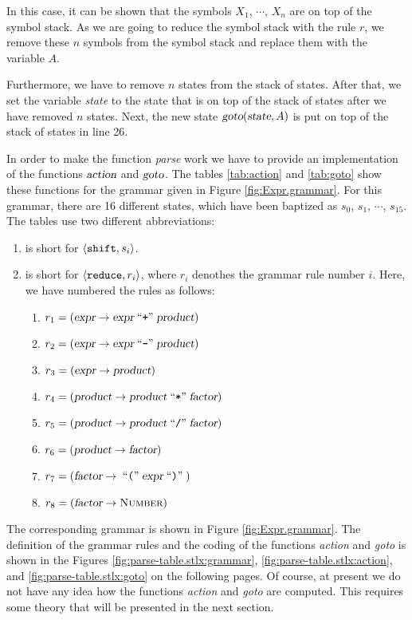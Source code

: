 \begin{enumerate}
\begin{enumerate}
            In this case, it can be shown that the symbols $X_1$, $\cdots$, $X_n$ are on top of the
            symbol stack.  As we are going to reduce the symbol stack with the rule $r$,
            we remove these $n$ symbols from the symbol stack and replace them with the
            variable $A$.
            
            Furthermore, we have to remove $n$ states from the stack of states.
            After that, we set the variable \textsl{state} to the state that is on top of the
            stack of states after we have removed $n$ states.  Next, the new state
            $\textsl{goto}(\textsl{state}, A)$ is put on top of the stack of states in line 26.
      \end{enumerate}
\end{enumerate}
In order to make the function \textsl{parse} work we have to provide an implementation
of the functions $\textsl{action}$ and $\textsl{goto}$.
The tables  \ref{tab:action} and \ref{tab:goto} show these functions for the grammar given
in Figure \ref{fig:Expr.grammar}.  For this grammar, there are 16 different states, which have
been baptized as $s_0$, $s_1$, $\cdots$, $s_{15}$.  The tables use two different abbreviations:
\begin{enumerate}
\item {} is short for $\pair(\texttt{shift}, s_i)$.
\item {} is short for  $\pair(\texttt{reduce}, r_i)$, where $r_i$ denothes the
      grammar rule number $i$.  Here, we have numbered the rules as follows:
      \begin{enumerate}
      \item $r_1 = (\textsl{expr} \rightarrow \textsl{expr} \;\mbox{``\texttt{+}''}\; \textsl{product})$
      \item $r_2 = (\textsl{expr} \rightarrow \textsl{expr} \;\mbox{``\texttt{-}''}\; \textsl{product})$
      \item $r_3 = (\textsl{expr} \rightarrow \textsl{product})$
      \item $r_4 = (\textsl{product} \rightarrow \textsl{product} \;\mbox{``\texttt{*}''}\; \textsl{factor})$
      \item $r_5 = (\textsl{product} \rightarrow \textsl{product} \;\mbox{``\texttt{/}''}\; \textsl{factor})$
      \item $r_6 = (\textsl{product} \rightarrow \textsl{factor})$
      \item $r_7 = (\textsl{factor} \rightarrow  \;\mbox{``\texttt{(}''}\; \textsl{expr} \;\mbox{``\texttt{)}''}\;)$
      \item $r_8 = (\textsl{factor} \rightarrow  \textsc{Number})$
      \end{enumerate}
\end{enumerate}
The corresponding grammar is shown in Figure \ref{fig:Expr.grammar}.  The definition of the grammar rules
and the coding of the
functions \textsl{action} and \textsl{goto} is shown in the Figures
\ref{fig:parse-table.stlx:grammar}, \ref{fig:parse-table.stlx:action}, and
\ref{fig:parse-table.stlx:goto} on the following pages.   Of course, at present we do not have any
idea how the functions \textsl{action} and \textsl{goto} are computed.  This requires some theory
that will be presented in the next section.


